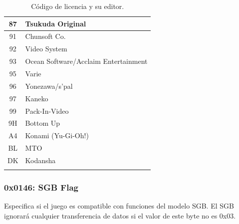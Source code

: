 \begin{longtable}{|c|l|}
87              & Tsukuda Original               \\ \hline
91              & Chunsoft Co.                   \\ \hline
92              & Video System                   \\ \hline
93              & Ocean Software/Acclaim Entertainment \\ \hline
95              & Varie                          \\ \hline
96              & Yonezawa/s’pal                 \\ \hline
97              & Kaneko                         \\ \hline
99              & Pack-In-Video                  \\ \hline
9H              & Bottom Up                      \\ \hline
A4              & Konami (Yu-Gi-Oh!)             \\ \hline
BL              & MTO                            \\ \hline
DK              & Kodansha                       \\ \hline
\caption{Código de licencia y su editor.} \\
\end{longtable}

\subsubsection{0x0146: SGB Flag}
Especifica si el juego es compatible con funciones del modelo SGB. El SGB ignorará cualquier transferencia de datos si el valor de este byte no es 0x03.

